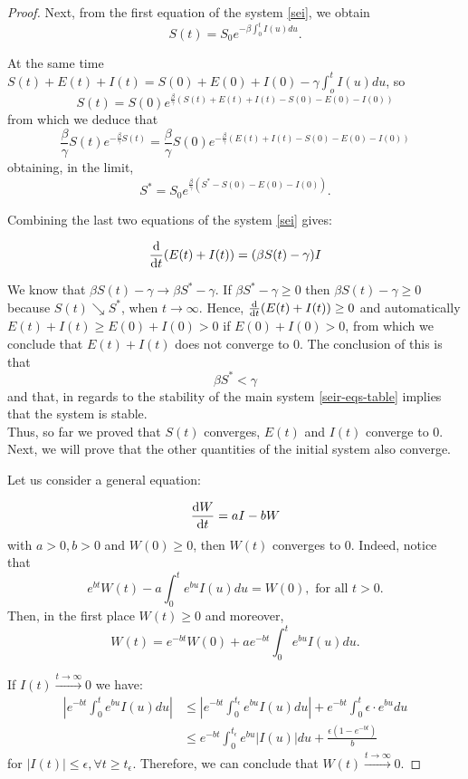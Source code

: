 \documentclass[11pt]{article}
\begin{document}
\begin{proof}
Next, from the first equation of the system \ref{sei}, we obtain
\[
S(t)=S_0 e^{-\beta \int_0^t I(u) du}.
\]

At the same time $S(t)+E(t)+I(t)=S(0)+E(0)+I(0)-\gamma \int_o^tI(u)du$, so $$S(t)=S(0)e^{\frac{\beta}{\gamma}(S(t)+E(t)+I(t)-S(0)-E(0)-I(0))}$$
from which we deduce that 
$$\frac{\beta}{\gamma}S(t)e^{-\frac{\beta}{\gamma}S(t)}=\frac{\beta}{\gamma}S(0)e^{-\frac{\beta}{\gamma}(E(t)+I(t)-S(0)-E(0)-I(0))}$$
obtaining, in the limit, 
$$
S^*=S_0e^{\frac{\beta}{\gamma}(S^*-S(0)-E(0)-I(0))}.
$$

Combining the last two equations of the system \ref{sei} gives:

\begin{equation*}
    \dv{}{t} {(E(t)+I(t))=(\beta S(t)-\gamma)I}
\end{equation*}

We know that $\beta S(t)-\gamma \rightarrow \beta S^*-\gamma $. If $\beta S^*-\gamma \geq 0$ then $\beta S(t)-\gamma\geq 0$ because $S(t)\searrow S^*$, when $t \rightarrow \infty$. 
Hence, $\dv{}{t} {(E(t)+I(t))\geq 0}$ and automatically $E(t)+I(t)\geq E(0)+I(0)>0$ if $E(0)+I(0)>0$, from which we conclude that $E(t)+I(t)$ does not converge to $0$. The conclusion of this is that 
\[
\beta S^*<\gamma
\]
and that, in regards to the stability of the main system \ref{seir-eqs-table} implies that the system is stable. \\

Thus, so far we proved that $S(t)$ converges, $E(t)$ and $I(t)$ converge to $0$. Next, we will prove that the other quantities of the initial system also converge.

Let us consider a general equation:

\begin{equation*}
    \dv{W}{t} = aI-bW
\end{equation*}
with $a>0, b>0$ and $W(0)\ge0$, then $W(t)$ converges to $0$.  Indeed, notice that  
\[
e^{bt}W(t)-a\int_0^t e^{bu}I(u)du=W(0), \text{ for all }t>0.  
\]
Then, in the first place $W(t)\ge0$ and moreover, 
\begin{equation}\label{eqm}
    W(t)=e^{-bt}W(0)+ae^{-bt}\int_0^t e^{bu}I(u)du.
\end{equation}

If $I(t) \xrightarrow{t \rightarrow\infty} 0$ we have:
\begin{align}
\left|e^{-bt}\int_0^t e^{bu}I(u)du \right| 
&\leq \left| e^{-bt}\int_0^{t_{\epsilon}} e^{bu}I(u)du\right| + e^{-bt}\int_0^t \epsilon \cdot e^{bu}du\nonumber\\
&\leq e^{-bt}\int_0^{t_{\epsilon}} e^{bu}|I(u)|du+\frac{\epsilon(1-e^{-bt})}{b}\nonumber
\end{align}
for $|I(t)|\leq \epsilon, \forall t\geq t_{\epsilon}$. Therefore, we can conclude that  $W(t) \xrightarrow{t \rightarrow\infty} 0$.


\end{proof}
\end{document}
